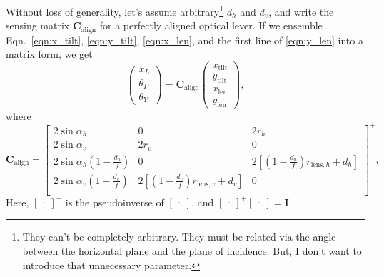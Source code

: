 Without loss of generality, let's assume arbitrary\footnote{They can't be completely arbitrary. They must be related via the angle between the horizontal plane and the plane of incidence. But, I don't want to introduce that unnecessary parameter.} $d_h$ and $d_v$, and write the sensing matrix $\mathbf{C}_\mathrm{align}$ for a perfectly aligned optical lever.
If we ensemble Eqn.~\eqref{eqn:x_tilt}, \eqref{eqn:y_tilt}, \eqref{eqn:x_len}, and the first line of \eqref{eqn:y_len} into a matrix form, we get
\begin{equation}
	\begin{pmatrix}
		x_L\\
		\theta_P\\
		\theta_Y
	\end{pmatrix}
	=
	\mathbf{C}_\mathrm{align}
	\begin{pmatrix}
		x_\mathrm{tilt}\\
		y_\mathrm{tilt}\\
		x_\mathrm{len}\\
		y_\mathrm{len}
	\end{pmatrix},
	\label{eqn:sensing_matrix_general}
\end{equation}
where
\begin{equation}
	\mathbf{C}_\mathrm{align}
	=
	\begin{bmatrix}
		2\sin\alpha_h & 0 & 2r_h\\
		2\sin\alpha_v & 2r_v & 0\\
		2\sin\alpha_h\left(1-\frac{d_h}{f}\right) & 0 & 2\left[\left(1-\frac{d_h}{f}\right)r_{\mathrm{lens},h}+d_h\right]\\
		2\sin\alpha_v\left(1-\frac{d_v}{f}\right) &  2\left[\left(1-\frac{d_v}{f}\right)r_{\mathrm{lens},v}+d_v\right] & 0\\
	\end{bmatrix}^{+},
\end{equation}
Here, $\begin{bmatrix}\cdot\end{bmatrix}^{+}$ is the pseudoinverse of $\begin{bmatrix}\cdot\end{bmatrix}$, and $\begin{bmatrix}\cdot\end{bmatrix}^{+}\begin{bmatrix}\cdot\end{bmatrix}=\mathbf{I}$.

